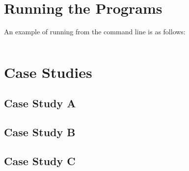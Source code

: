 \documentclass{l4proj}
\begin{document}
\begin{appendices}
\chapter{Running the Programs}
An example of running from the command line is as follows:
\begin{verbatim}
\end{verbatim}

\chapter{Case Studies}
\section{Case Study A}
\label{casestudyA}

\section{Case Study B}
\label{casestudyB}

\section{Case Study C}
\label{casestudyC}


\end{appendices}




\end{document}
